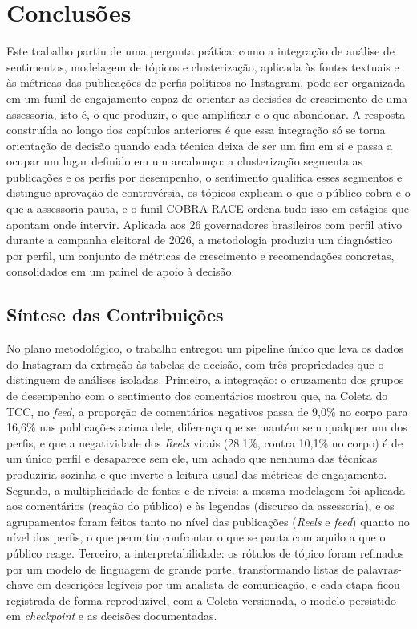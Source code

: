 \chapter{Conclusões}\label{Conclusões}

Este trabalho partiu de uma pergunta prática: como a integração de análise de sentimentos, modelagem de tópicos e clusterização, aplicada às fontes textuais e às métricas das publicações de perfis políticos no Instagram, pode ser organizada em um funil de engajamento capaz de orientar as decisões de crescimento de uma assessoria, isto é, o que produzir, o que amplificar e o que abandonar. A resposta construída ao longo dos capítulos anteriores é que essa integração só se torna orientação de decisão quando cada técnica deixa de ser um fim em si e passa a ocupar um lugar definido em um arcabouço: a clusterização segmenta as publicações e os perfis por desempenho, o sentimento qualifica esses segmentos e distingue aprovação de controvérsia, os tópicos explicam o que o público cobra e o que a assessoria pauta, e o funil COBRA-RACE ordena tudo isso em estágios que apontam onde intervir. Aplicada aos 26 governadores brasileiros com perfil ativo durante a campanha eleitoral de 2026, a metodologia produziu um diagnóstico por perfil, um conjunto de métricas de crescimento e recomendações concretas, consolidados em um painel de apoio à decisão.

\section{Síntese das Contribuições}

No plano metodológico, o trabalho entregou um pipeline único que leva os dados do Instagram da extração às tabelas de decisão, com três propriedades que o distinguem de análises isoladas. Primeiro, a integração: o cruzamento dos grupos de desempenho com o sentimento dos comentários mostrou que, na Coleta do TCC, no \emph{feed}, a proporção de comentários negativos passa de 9,0\% no corpo para 16,6\% nas publicações acima dele, diferença que se mantém sem qualquer um dos perfis, e que a negatividade dos \emph{Reels} virais (28,1\%, contra 10,1\% no corpo) é de um único perfil e desaparece sem ele, um achado que nenhuma das técnicas produziria sozinha e que inverte a leitura usual das métricas de engajamento.
Segundo, a multiplicidade de fontes e de níveis: a mesma modelagem foi aplicada aos comentários (reação do público) e às legendas (discurso da assessoria), e os agrupamentos foram feitos tanto no nível das publicações (\emph{Reels} e \emph{feed}) quanto no nível dos perfis, o que permitiu confrontar o que se pauta com aquilo a que o público reage. Terceiro, a interpretabilidade: os rótulos de tópico foram refinados por um modelo de linguagem de grande porte, transformando listas de palavras-chave em descrições legíveis por um analista de comunicação, e cada etapa ficou registrada de forma reproduzível, com a Coleta versionada, o modelo persistido em \emph{checkpoint} e as decisões documentadas.

